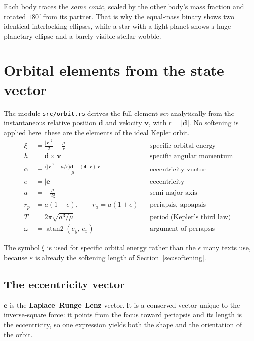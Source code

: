 \documentclass[11pt,a4paper]{article}
\newcommand{\vd}{\mathbf{d}}
\newcommand{\vv}{\mathbf{v}}
\newcommand{\ve}{\mathbf{e}}
\begin{document}
Each body traces the \emph{same conic}, scaled by the other body's mass fraction
and rotated $180^\circ$ from its partner. That is why the equal-mass binary
shows two identical interlocking ellipses, while a star with a light planet
shows a huge planetary ellipse and a barely-visible stellar wobble.

\section{Orbital elements from the state vector}
\label{sec:elements}

The module \texttt{src/orbit.rs} derives the full element set analytically from
the instantaneous relative position $\vd$ and velocity $\vv$, with $r = |\vd|$.
No softening is applied here: these are the elements of the ideal Kepler orbit.
\begin{align*}
  \xi   &= \frac{|\vv|^{2}}{2} - \frac{\mu}{r} &&\text{specific orbital energy}\\
  h     &= \vd \times \vv &&\text{specific angular momentum}\\
  \ve   &= \frac{\bigl(|\vv|^{2} - \mu/r\bigr)\vd - (\vd\cdot\vv)\,\vv}{\mu}
          &&\text{eccentricity vector}\\
  e     &= |\ve| &&\text{eccentricity}\\
  a     &= -\frac{\mu}{2\xi} &&\text{semi-major axis}\\
  r_p   &= a(1-e), \qquad r_a = a(1+e) &&\text{periapsis, apoapsis}\\
  T     &= 2\pi\sqrt{a^{3}/\mu} &&\text{period (Kepler's third law)}\\
  \omega &= \operatorname{atan2}(e_y,\,e_x) &&\text{argument of periapsis}
\end{align*}

The symbol $\xi$ is used for specific orbital energy rather than the $\epsilon$
many texts use, because $\varepsilon$ is already the softening length of
Section~\ref{sec:softening}.

\subsection{The eccentricity vector}

$\ve$ is the \textbf{Laplace--Runge--Lenz} vector. It is a conserved vector
unique to the inverse-square force: it points from the focus toward periapsis
and its length is the eccentricity, so one expression yields both the shape and
the orientation of the orbit.
\end{document}
